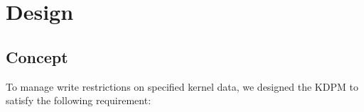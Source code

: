 \section{Design} \label{section:approach}

\subsection{Concept} \label{subsection:design}

To manage write restrictions on specified kernel data, we designed the KDPM to
satisfy the following requirement: 


